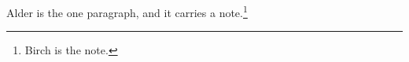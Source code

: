 \documentclass{article}
\begin{document}
Alder is the one paragraph, and it carries a note.\footnote{Birch is the note.}
\end{document}
